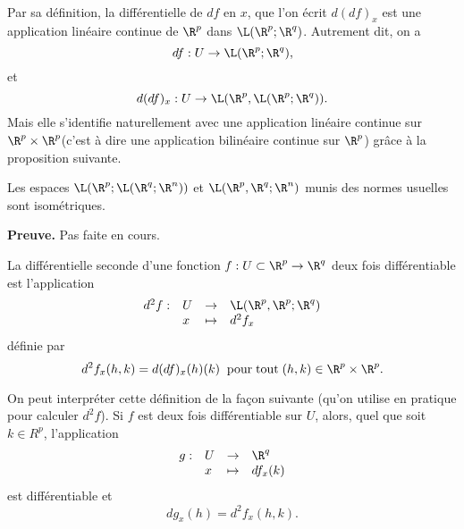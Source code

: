 \documentclass[class=report,crop=false]{standalone}
\begin{document}
  \begin{remarque*}
\textcolor[rgb]{0.00,0.00,1.00}{ \\
Par sa d\'efinition, la diff\'erentielle de $df$ en $x$, que l'on \'ecrit $d(df)_x$ est une application
lin\'eaire continue de $\R^p$ dans $\L(\R^p;\R^q)$. Autrement dit, on a
\begin{equation*}
  df:U \rightarrow \L(\R^p;\R^q),
\end{equation*}
et
\begin{equation*}
  d(df)_x: U\rightarrow \L(\R^p,\L(\R^p;\R^q)).
\end{equation*}
 Mais elle s'identifie naturellement avec une application lin\'eaire
continue sur $\R^p \times \R^p$(c'est à dire une application bilinéaire continue sur
$\R^p$)  gr\^ace \`a la proposition suivante.
}
\end{remarque*}

 \begin{proposition}
\textcolor[rgb]{0.50,0.00,0.25}{
Les espaces $\L(\R^p;\L(\R^q;\R^n))$ et
$\L(\R^p,\R^q;\R^n)$ munis des normes usuelles
sont isom\'etriques.
}
\end{proposition}


{\textbf{Preuve.}} Pas faite en cours.


\begin{definition}
\textcolor[rgb]{0.73,0.00,0.00}{
  La diff\'erentielle seconde d'une fonction $f: U\subset \R^p\rightarrow \R^q$ deux fois diff\'erentiable
est l'application
\begin{equation*}
  \begin{array}{clll}
    d^2 f:& U & \rightarrow & \L(\R^p,\R^p;\R^q) \\
     & x & \mapsto & d^2f_x
  \end{array}
\end{equation*}
d\'efinie par
\begin{equation*}
  d^2f_x(h,k)=d(df)_x(h)(k) \;\mathrm{\; pour \; tout\;} (h,k)\in \R^p \times \R^p.
\end{equation*}}
\end{definition}

\begin{remarque*}\textcolor[rgb]{0.00,0.00,1.00}{
  On peut interpr\'eter cette d\'efinition de la fa\c{c}on suivante (qu'on utilise en pratique
pour calculer $d^2f$). Si $f$ est deux fois diff\'erentiable sur $U$, alors, quel que soit $k \in R^p$,
l'application
\begin{equation*}
  \begin{array}{clll}
    g:& U & \rightarrow & \R^q \\
     & x & \mapsto & df_x(k)
  \end{array}
\end{equation*}
est diff\'erentiable et
\begin{equation*}
  dg_x(h)=d^2f_x(h,k).
\end{equation*}}
\end{remarque*}
\end{document}
